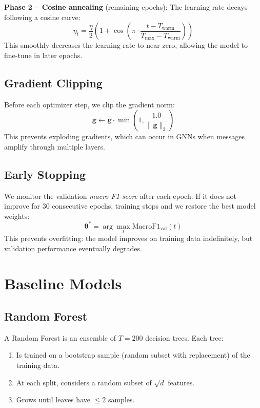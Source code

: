 \documentclass[conference]{IEEEtran}
\newcommand{\vect}[1]{\bm{#1}}
\begin{document}
\textbf{Phase 2 -- Cosine annealing} (remaining epochs): The learning rate decays following a cosine curve:
\begin{equation}
    \eta_t = \frac{\eta}{2} \left(1 + \cos\left(\pi \cdot \frac{t - T_{\text{warm}}}{T_{\max} - T_{\text{warm}}}\right)\right)
\end{equation}
This smoothly decreases the learning rate to near zero, allowing the model to fine-tune in later epochs.

\subsection{Gradient Clipping}

Before each optimizer step, we clip the gradient norm:
\begin{equation}
    \vect{g} \leftarrow \vect{g} \cdot \min\!\left(1, \frac{1.0}{\|\vect{g}\|_2}\right)
\end{equation}
This prevents exploding gradients, which can occur in GNNs when messages amplify through multiple layers.

\subsection{Early Stopping}

We monitor the validation \emph{macro F1-score} after each epoch. If it does not improve for 30 consecutive epochs, training stops and we restore the best model weights:
\begin{equation}
    \bm{\theta}^* = \arg\max_{t} \text{MacroF1}_{\text{val}}(t)
\end{equation}
This prevents overfitting: the model improves on training data indefinitely, but validation performance eventually degrades.

\section{Baseline Models}
\label{sec:baselines}

\subsection{Random Forest}

A Random Forest is an ensemble of $T = 200$ decision trees. Each tree:
\begin{enumerate}
    \item Is trained on a bootstrap sample (random subset with replacement) of the training data.
    \item At each split, considers a random subset of $\sqrt{d}$ features.
    \item Grows until leaves have $\leq 2$ samples.
\end{enumerate}
\end{document}
